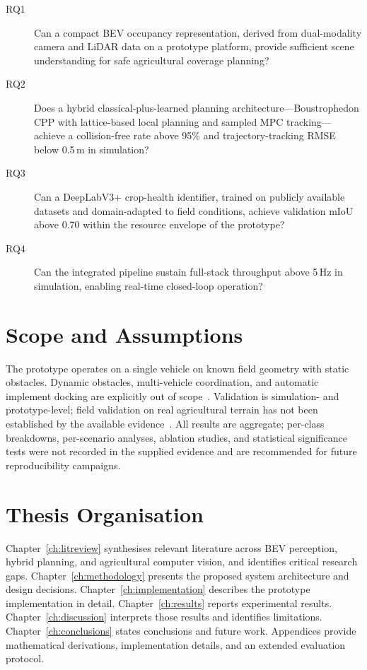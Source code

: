 \documentclass[12pt, a4paper]{article}
\begin{document}
\begin{description}
  \item[RQ1] Can a compact BEV occupancy representation, derived from dual-modality camera
  and LiDAR data on a prototype platform, provide sufficient scene understanding for safe
  agricultural coverage planning?
  \item[RQ2] Does a hybrid classical-plus-learned planning architecture---Boustrophedon CPP
  with lattice-based local planning and sampled MPC tracking---achieve a collision-free rate
  above 95\% and trajectory-tracking RMSE below 0.5\,m in simulation?
  \item[RQ3] Can a DeepLabV3+ crop-health identifier, trained on publicly available
  datasets and domain-adapted to field conditions, achieve validation mIoU above 0.70
  within the resource envelope of the prototype?
  \item[RQ4] Can the integrated pipeline sustain full-stack throughput above 5\,Hz in
  simulation, enabling real-time closed-loop operation?
\end{description}

\section{Scope and Assumptions}

The prototype operates on a single vehicle on known field geometry with static obstacles.
Dynamic obstacles, multi-vehicle coordination, and automatic implement docking are
explicitly out of scope~\cite{ref3}. Validation is simulation- and prototype-level; field
validation on real agricultural terrain has not been established by the available
evidence~\cite{ref234}. All results are aggregate; per-class breakdowns, per-scenario
analyses, ablation studies, and statistical significance tests were not recorded in the
supplied evidence and are recommended for future reproducibility campaigns.

\section{Thesis Organisation}

Chapter~\ref{ch:litreview} synthesises relevant literature across BEV perception, hybrid
planning, and agricultural computer vision, and identifies critical research gaps.
Chapter~\ref{ch:methodology} presents the proposed system architecture and design
decisions. Chapter~\ref{ch:implementation} describes the prototype implementation in
detail. Chapter~\ref{ch:results} reports experimental results. Chapter~\ref{ch:discussion}
interprets those results and identifies limitations. Chapter~\ref{ch:conclusions} states
conclusions and future work. Appendices provide mathematical derivations, implementation
details, and an extended evaluation protocol.
\end{document}
